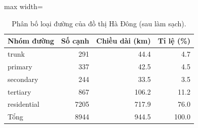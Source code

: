 \begin{table}[!htbp]
\centering
\small
\caption{Phân bố loại đường của đồ thị Hà Đông (sau làm sạch).}
\label{tab:tab_graph_groups}
\begin{adjustbox}{max width=\linewidth}
\begin{tabular}{lrrr}
\toprule
Nhóm đường & Số cạnh & Chiều dài (km) & Tỉ lệ (\%) \\
\midrule
trunk & 291 & 44.4 & 4.7 \\
primary & 337 & 42.5 & 4.5 \\
secondary & 244 & 33.5 & 3.5 \\
tertiary & 867 & 106.2 & 11.2 \\
residential & 7205 & 717.9 & 76.0 \\
Tổng & 8944 & 944.5 & 100.0 \\
\bottomrule
\end{tabular}
\end{adjustbox}
\end{table}
